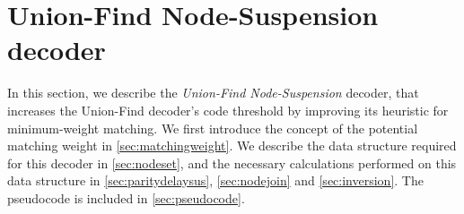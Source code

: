 \section{Union-Find Node-Suspension decoder}\label{sec:ufbb}

In this section, we describe the \emph{Union-Find Node-Suspension} decoder, that increases the Union-Find decoder's code threshold by improving its heuristic for minimum-weight matching. We first introduce the concept of the potential matching weight in \ref{sec:matchingweight}. We describe the data structure required for this decoder in \ref{sec:nodeset}, and the necessary calculations performed on this data structure in \ref{sec:paritydelaysus}, \ref{sec:nodejoin} and \ref{sec:inversion}. The pseudocode is included in \ref{sec:pseudocode}. 